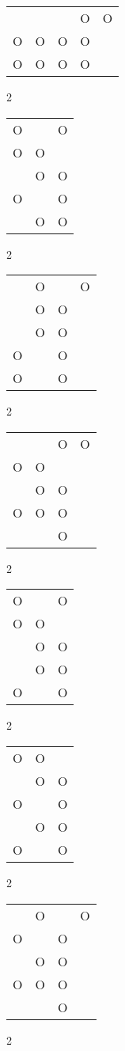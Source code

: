 \begin{tabular}{|m{0.2cm}m{0.2cm}m{0.2cm}m{0.2cm}m{0.2cm}|}\hline
 & & &O&O\\
O&O&O&O& \\
O&O&O&O& \\
\hline\end{tabular}2
\begin{tabular}{|m{0.2cm}m{0.2cm}m{0.2cm}|}\hline
O& &O\\
O&O& \\
 &O&O\\
O& &O\\
 &O&O\\
\hline\end{tabular}2
\begin{tabular}{|m{0.2cm}m{0.2cm}m{0.2cm}m{0.2cm}|}\hline
 &O& &O\\
 &O&O& \\
 &O&O& \\
O& &O& \\
O& &O& \\
\hline\end{tabular}2
\begin{tabular}{|m{0.2cm}m{0.2cm}m{0.2cm}m{0.2cm}|}\hline
 & &O&O\\
O&O& & \\
 &O&O& \\
O&O&O& \\
 & &O& \\
\hline\end{tabular}2
\begin{tabular}{|m{0.2cm}m{0.2cm}m{0.2cm}|}\hline
O& &O\\
O&O& \\
 &O&O\\
 &O&O\\
O& &O\\
\hline\end{tabular}2
\begin{tabular}{|m{0.2cm}m{0.2cm}m{0.2cm}|}\hline
O&O& \\
 &O&O\\
O& &O\\
 &O&O\\
O& &O\\
\hline\end{tabular}2
\begin{tabular}{|m{0.2cm}m{0.2cm}m{0.2cm}m{0.2cm}|}\hline
 &O& &O\\
O& &O& \\
 &O&O& \\
O&O&O& \\
 & &O& \\
\hline\end{tabular}2

